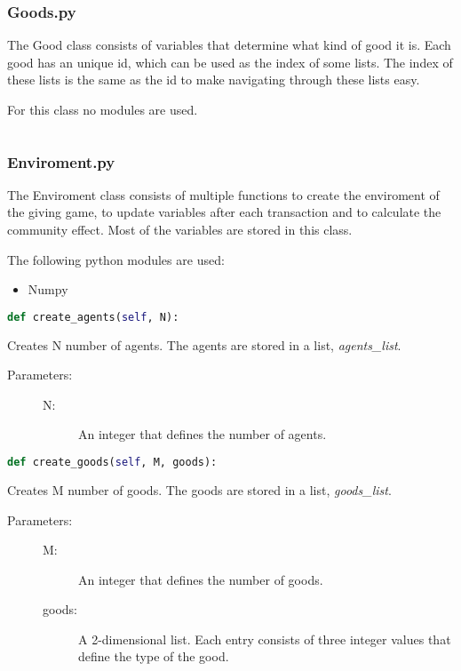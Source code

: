 \documentclass{article}
\begin{document}
\subsubsection{Goods.py}
The Good class consists of variables that determine what kind of good it is. Each good has an unique id, which can be used as the index of some lists. The index of these lists is the same as the id to make navigating through these lists easy.

For this class no modules are used.

\begin{lstlisting}[language=Python]

\end{lstlisting}

\subsubsection{Enviroment.py}
The Enviroment class consists of multiple functions to create the enviroment of the giving game, to update variables after each transaction and to calculate the community effect. Most of the variables are stored in this class.

The following python modules are used:
\begin{itemize}
  \item Numpy
\end{itemize}


\begin{lstlisting}[language=Python]
def create_agents(self, N):
\end{lstlisting}
Creates N number of agents.
The agents are stored in a list, \textit{agents\_list}.

\begin{description}
  \item[Parameters:] \hfill
	\begin{description}
  		\item[N:] An integer that defines the number of agents.
	\end{description}

\end{description}

\begin{lstlisting}[language=Python]
def create_goods(self, M, goods):
\end{lstlisting}
Creates M number of goods.
The goods are stored in a list, \textit{goods\_list}.

\begin{description}
  \item[Parameters:] \hfill
	\begin{description}
  		\item[M:] An integer that defines the number of goods.
		\item[goods:] A 2-dimensional list. Each entry consists of three integer values that define the type of the good.
	\end{description}

\end{description}
\end{document}
